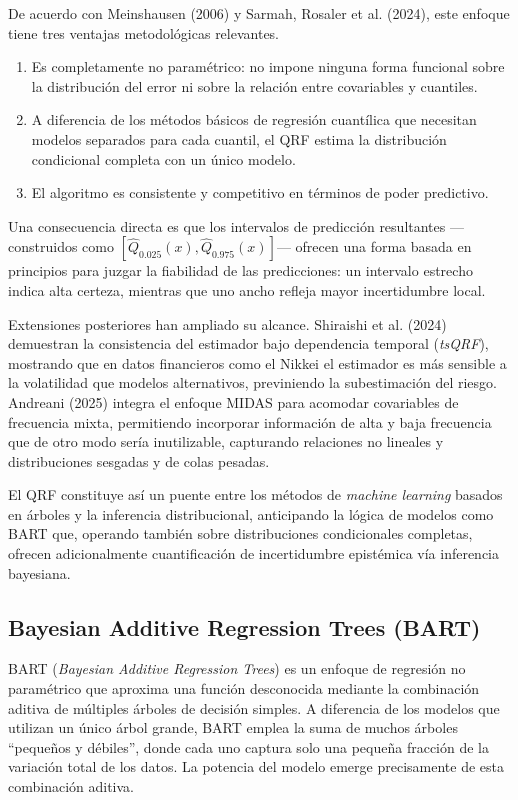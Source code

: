 ﻿\documentclass[11pt,a4paper]{article}
\begin{document}
De acuerdo con Meinshausen (2006) y Sarmah, Rosaler et al. (2024), este enfoque tiene tres ventajas metodológicas relevantes.

\begin{enumerate}
    \item Es completamente no paramétrico: no impone ninguna forma funcional sobre la distribución del error ni sobre la relación entre covariables y cuantiles.
    
    \item A diferencia de los métodos básicos de regresión cuantílica que necesitan modelos separados para cada cuantil, el QRF estima la distribución condicional completa con un único modelo.
    
    \item El algoritmo es consistente y competitivo en términos de poder predictivo.
\end{enumerate}

Una consecuencia directa es que los intervalos de predicción resultantes —construidos como $[\hat{Q}_{0.025}(x),\hat{Q}_{0.975}(x)]$— ofrecen una forma basada en principios para juzgar la fiabilidad de las predicciones: un intervalo estrecho indica alta certeza, mientras que uno ancho refleja mayor incertidumbre local.

Extensiones posteriores han ampliado su alcance. Shiraishi et al. (2024) demuestran la consistencia del estimador bajo dependencia temporal (\textit{tsQRF}), mostrando que en datos financieros como el Nikkei el estimador es más sensible a la volatilidad que modelos alternativos, previniendo la subestimación del riesgo. Andreani (2025) integra el enfoque MIDAS para acomodar covariables de frecuencia mixta, permitiendo incorporar información de alta y baja frecuencia que de otro modo sería inutilizable, capturando relaciones no lineales y distribuciones sesgadas y de colas pesadas.

El QRF constituye así un puente entre los métodos de \textit{machine learning} basados en árboles y la inferencia distribucional, anticipando la lógica de modelos como BART que, operando también sobre distribuciones condicionales completas, ofrecen adicionalmente cuantificación de incertidumbre epistémica vía inferencia bayesiana.

\subsection{Bayesian Additive Regression Trees (BART)}

BART (\textit{Bayesian Additive Regression Trees}) es un enfoque de regresión no paramétrico que aproxima una función desconocida mediante la combinación aditiva de múltiples árboles de decisión simples. A diferencia de los modelos que utilizan un único árbol grande, BART emplea la suma de muchos árboles “pequeños y débiles”, donde cada uno captura solo una pequeña fracción de la variación total de los datos. La potencia del modelo emerge precisamente de esta combinación aditiva.
\end{document}
